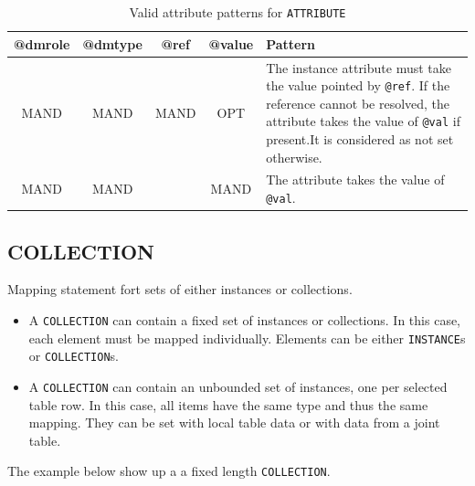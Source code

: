 \documentclass[11pt,a4paper]{ivoa}
\begin{document}
\begin{table}[!t]
\small
\centering
\begin{tabulary}{1.0\linewidth}{|c|c|c|c|J|}

    \hline    
          \textbf{@dmrole}  &  
          \textbf{@dmtype} &  
          \textbf{@ref} &  
          \textbf{@value} &  
          \textbf{Pattern}\\
    \hline   \hline 
          MAND & 
          MAND &  
          MAND &  
          OPT & 
          The instance attribute must take the value pointed by \texttt{@ref}. 
           \newline If the reference cannot be resolved, the attribute takes the value of \texttt{@val} if present.\newline  It is considered as not set otherwise.   \\
     \hline  
          MAND & 
          MAND &   
          &  
          MAND & 
          The attribute takes the value of \texttt{@val}.   \\
     \hline 
  \end{tabulary}
  \caption{Valid attribute patterns for  \texttt{ATTRIBUTE}} 
  \label{tbl:att-pattern}
 \end{table}



%
%

\subsection{COLLECTION}

Mapping statement fort sets of either instances or collections.

\begin{itemize}
    \item A \texttt{COLLECTION} can contain a fixed set of instances or collections. 
            In this case, each element must be mapped individually.  
            Elements can be either \texttt{INSTANCE}s or \texttt{COLLECTION}s.
    \item A \texttt{COLLECTION} can contain an unbounded set of instances, one per selected table row. 
            In this case, all items have the same type and thus the same mapping. 
           They can be set with local table  data or with data from a joint table.
 \end{itemize}

The example below show up a a fixed length \texttt{COLLECTION}.
\end{document}
